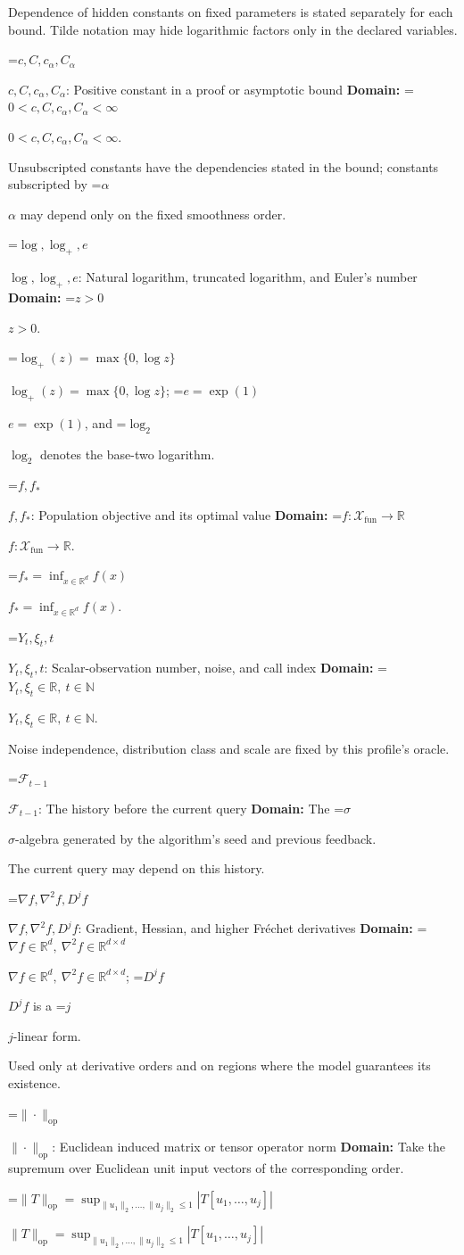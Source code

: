 \documentclass[10pt,a4paper]{article}
\newcommand{\AtlasMath}[1]{\par\begingroup\centering\setbox0=\hbox{$\displaystyle #1$}\ifdim\wd0>1.4\linewidth\typeout{ATLAS WIDE FORMULA: \the\wd0}\fi\ifdim\wd0>\linewidth\resizebox{\linewidth}{!}{\box0}\else\box0\fi\par\endgroup}
\newcommand{\AtlasInlineMath}[1]{\begingroup\setbox0=\hbox{$#1$}\ifdim\wd0>.4\linewidth\endgroup\AtlasMath{#1}\else\endgroup$#1$\fi}
\begin{document}
Dependence of hidden constants on fixed parameters is stated separately for each bound. Tilde notation may hide logarithmic factors only in the declared variables.

\AtlasInlineMath{c,C,c_\alpha,C_\alpha}: Positive constant in a proof or asymptotic bound \textbf{Domain:} \AtlasInlineMath{0<c,C,c_\alpha,C_\alpha<\infty}.

Unsubscripted constants have the dependencies stated in the bound; constants subscripted by \AtlasInlineMath{\alpha} may depend only on the fixed smoothness order.

\AtlasInlineMath{\log,\log_+,e}: Natural logarithm, truncated logarithm, and Euler's number \textbf{Domain:} \AtlasInlineMath{z>0}.

\AtlasInlineMath{\log_+(z)=\max\{0,\log z\}}; \AtlasInlineMath{e=\exp(1)}, and \AtlasInlineMath{\log_2} denotes the base-two logarithm.

\AtlasInlineMath{f,f_*}: Population objective and its optimal value \textbf{Domain:} \AtlasInlineMath{f:\mathcal{X}_{\mathrm{fun}}\to\mathbb{R}}.

\AtlasInlineMath{f_*=\inf_{x\in \mathbb{R}^d}f(x)}.

\AtlasInlineMath{Y_t,\xi_t,t}: Scalar-observation number, noise, and call index \textbf{Domain:} \AtlasInlineMath{Y_t,\xi_t\in\mathbb{R},\ t\in\mathbb{N}}.

Noise independence, distribution class and scale are fixed by this profile's oracle.

\AtlasInlineMath{\mathcal{F}_{t-1}}: The history before the current query \textbf{Domain:} The \AtlasInlineMath{\sigma}-algebra generated by the algorithm's seed and previous feedback.

The current query may depend on this history.

\AtlasInlineMath{\nabla f,\nabla^2f,D^jf}: Gradient, Hessian, and higher Fréchet derivatives \textbf{Domain:} \AtlasInlineMath{\nabla f\in\mathbb{R}^d,\ \nabla^2f\in\mathbb{R}^{d\times d}}; \AtlasInlineMath{D^jf} is a \AtlasInlineMath{j}-linear form.

Used only at derivative orders and on regions where the model guarantees its existence.

\AtlasInlineMath{\|\cdot\|_{\mathrm{op}}}: Euclidean induced matrix or tensor operator norm \textbf{Domain:} Take the supremum over Euclidean unit input vectors of the corresponding order.

\AtlasInlineMath{\|T\|_{\mathrm{op}}=\sup_{\|u_1\|_2,\ldots,\|u_j\|_2\le1}|T[u_1,\ldots,u_j]|}
\end{document}
